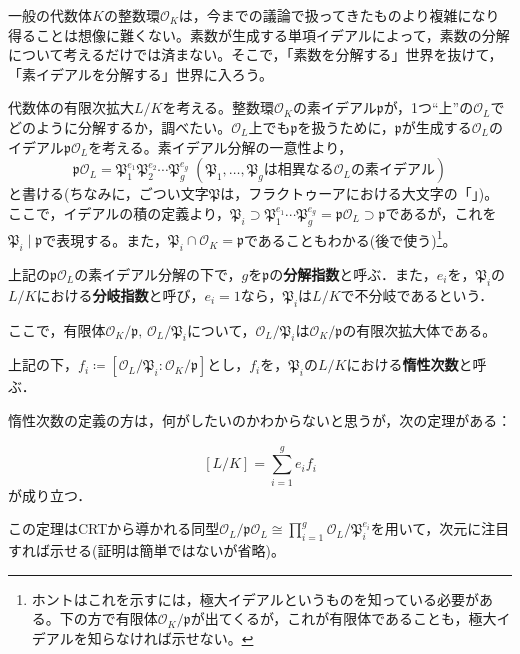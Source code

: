 \vspace{10pt}

一般の代数体$K$の整数環$\mathcal{O}_K$は，今までの議論で扱ってきたものより複雑になり得ることは想像に難くない。素数が生成する単項イデアルによって，素数の分解について考えるだけでは済まない。そこで，「素数を分解する」世界を抜けて，「素イデアルを分解する」世界に入ろう。

代数体の有限次拡大$L/K$を考える。整数環$\mathcal{O}_K$の素イデアル$\mathfrak{p}$が，1つ``上''の$\mathcal{O}_L$でどのように分解するか，調べたい。$\mathcal{O}_L$上でも$\mathfrak{p}$を扱うために，$\mathfrak{p}$が生成する$\mathcal{O}_L$のイデアル$\mathfrak{p}\mathcal{O}_L$を考える。素イデアル分解の一意性より，
\begin{equation}\label{prime_bunkai}
\mathfrak{p}\mathcal{O}_L=\mathfrak{P}_1^{e_1}\mathfrak{P}_2^{e_2}\cdots\mathfrak{P}_g^{e_g}\; (\mathfrak{P}_1,\ldots,\mathfrak{P}_g\text{は相異なる}\mathcal{O}_L\text{の素イデアル})
\end{equation}
と書ける(ちなみに，ごつい文字$\mathfrak{P}$は，フラクトゥーアにおける大文字の「」)。ここで，イデアルの積の定義より，$\mathfrak{P}_i\supset\mathfrak{P}_1^{e_1}\cdots\mathfrak{P}_g^{e_g}=\mathfrak{p}\mathcal{O}_L\supset\mathfrak{p}$であるが，これを$\mathfrak{P}_i\mid\mathfrak{p}$で表現する。また，$\mathfrak{P}_i\cap\mathcal{O}_K=\mathfrak{p}$であることもわかる(後で使う)\footnote{ホントはこれを示すには，極大イデアルというものを知っている必要がある。下の方で有限体$\mathcal{O}_K/{\mathfrak{p}}$が出てくるが，これが有限体であることも，極大イデアルを知らなければ示せない。}。

\begin{dfn}
    上記の$\mathfrak{p}\mathcal{O}_L$の素イデアル分解の下で，$g$を$\mathfrak{p}$の\textbf{分解指数}と呼ぶ．また，$e_i$を，$\mathfrak{P}_i$の$L/K$における\textbf{分岐指数}と呼び，$e_i=1$なら，$\mathfrak{P}_i$は$L/K$で不分岐であるという．
\end{dfn}

ここで，有限体$\mathcal{O}_K/{\mathfrak{p}},\,\mathcal{O}_L/{\mathfrak{P}_i}$について，$\mathcal{O}_L/{\mathfrak{P}_i}$は$\mathcal{O}_K/{\mathfrak{p}}$の有限次拡大体である。
\begin{dfn}[惰性次数]
    上記の下，$f_i\coloneqq [\mathcal{O}_L/{\mathfrak{P}_i}:\mathcal{O}_K/{\mathfrak{p}}]$とし，$f_i$を，$\mathfrak{P}_i$の$L/K$における\textbf{惰性次数}と呼ぶ．
\end{dfn}
惰性次数の定義の方は，何がしたいのかわからないと思うが，次の定理がある：
\begin{thm}\label{toshiki_sp}
    \[
    [L/K]=\sum_{i=1}^{g}e_if_i
    \]が成り立つ．
\end{thm}
この定理はCRTから導かれる同型$\mathcal{O}_L/{\mathfrak{p}\mathcal{O}_L}\cong\prod_{i=1}^{g}\mathcal{O}_L/{\mathfrak{P}_i^{e_i}}$を用いて，次元に注目すれば示せる(証明は簡単ではないが省略)。

